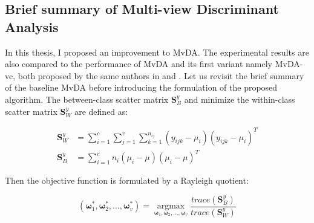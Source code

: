 
\subsection{Brief summary of Multi-view Discriminant Analysis}
    In this thesis, I proposed an improvement to MvDA.
    The experimental results are also compared to the performance of MvDA and its first variant namely MvDA-vc, both proposed by the same authors in \cite{kan2015multi} and \cite{kan2016multi}.
    Let us revisit the brief summary of the baseline MvDA before introducing the formulation of the proposed algorithm.
    The between-class scatter matrix $\boldsymbol{S}_B^y$ and minimize the within-class scatter matrix $\boldsymbol{S}_W^y$ are defined as: 

    \begin{align}
        \boldsymbol{S}_W^y &= \sum_{i=1}^{c}\sum_{j=1}^{v}\sum_{k=1}^{n_{ij}}(y_{ijk}-\mu_i)(y_{ijk}-\mu_i)^T \label{eq:MvDA_Sw}\\
        \boldsymbol{S}_B^y &= \sum_{i=1}^{c}n_i(\mu_i - \mu)(\mu_i - \mu)^T \label{eq:MvDA_Sb}
    \end{align}

    Then the objective function is formulated by a Rayleigh quotient:

    \begin{equation}
        (\boldsymbol{\omega}_1^*,\boldsymbol{\omega}_2^*, ..., \boldsymbol{\omega}_v^*) = \operatorname*{argmax}_{\boldsymbol{\omega}_1, \boldsymbol{\omega}_2,..., \boldsymbol{\omega}_v}\frac{trace(\boldsymbol{S}_B^y)}{trace(\boldsymbol{S}_W^y)}
    \end{equation}


